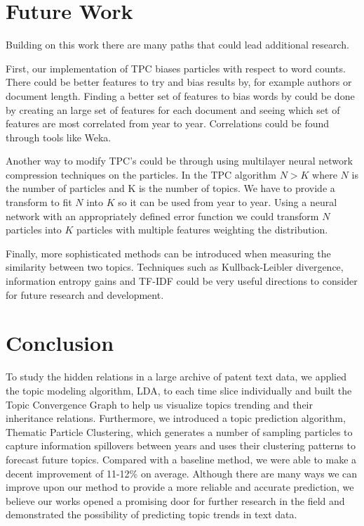 \documentclass[conference]{IEEEtran}
\begin{document}
\section{Future Work}
Building on this work there are many paths that could lead additional research.

First, our implementation of TPC biases particles with respect to word counts. There could be better features to try and bias results by, for example authors or document length. Finding a better set of features to bias words by could be done by creating an large set of features for each document and seeing which set of features are most correlated from year to year. Correlations could be found through tools like Weka. 

Another way to modify TPC's could be through using multilayer neural network compression techniques on the particles. In the TPC algorithm $N>K$ where $N$ is the number of particles and K is the number of topics. We have to provide a transform to fit $N$ into $K$ so it can be used from year to year. Using a neural network with an appropriately defined error function we could transform $N$ particles into $K$ particles with multiple features weighting the distribution.

Finally, more sophisticated methods can be introduced when measuring the similarity between two topics. Techniques such as Kullback-Leibler divergence, information entropy gains and TF-IDF could be very useful directions to consider for future research and development. 

\section{Conclusion}

To study the hidden relations in a large archive of patent text data, we applied the topic modeling algorithm, LDA, to each time slice individually and built the Topic Convergence Graph to help us visualize topics trending and their inheritance relations. Furthermore, we introduced a topic prediction algorithm, Thematic Particle Clustering, which generates a number of sampling particles to capture information spillovers between years and uses their clustering patterns to forecast future topics. Compared with a baseline method, we were able to make a decent improvement of 11-12\% on average. Although there are many ways we can improve upon our method to provide a more reliable and accurate prediction, we believe our works opened a promising door for further research in the field and demonstrated the possibility of predicting topic trends in text data.
\end{document}
